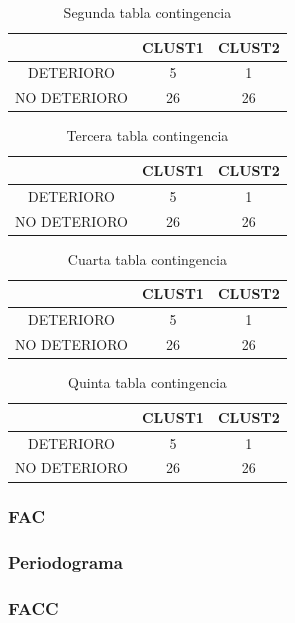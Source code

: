     \begin{table}[H]
    \centering
    \begin{tabular}{|c|c|c|}
        \hline
               & CLUST1 & CLUST2 \\
        \hline
        DETERIORO & 5 & 1 \\
        NO DETERIORO & 26 & 26 \\
        \hline
    \end{tabular}
    \caption{Segunda tabla contingencia}
    \label{tab:raw_data_contingencia2}
    \end{table}
    
    \begin{table}[H]
    \centering
    \begin{tabular}{|c|c|c|}
        \hline
               & CLUST1 & CLUST2 \\
        \hline
        DETERIORO & 5 & 1 \\
        NO DETERIORO & 26 & 26 \\
        \hline
    \end{tabular}
    \caption{Tercera tabla contingencia}
    \label{tab:raw_data_contingencia3}
    \end{table}
    
    \begin{table}[H]
    \centering
    \begin{tabular}{|c|c|c|}
        \hline
               & CLUST1 & CLUST2 \\
        \hline
        DETERIORO & 5 & 1 \\
        NO DETERIORO & 26 & 26 \\
        \hline
    \end{tabular}
    \caption{Cuarta tabla contingencia}
    \label{tab:raw_data_contingencia4}
    \end{table}
    
    \begin{table}[H]
    \centering
    \begin{tabular}{|c|c|c|}
        \hline
               & CLUST1 & CLUST2 \\
        \hline
        DETERIORO & 5 & 1 \\
        NO DETERIORO & 26 & 26 \\
        \hline
    \end{tabular}
    \caption{Quinta tabla contingencia}
    \label{tab:raw_data_contingencia5}
    \end{table}
    
    


\subsubsection{FAC}

\subsubsection{Periodograma}

\subsubsection{FACC}